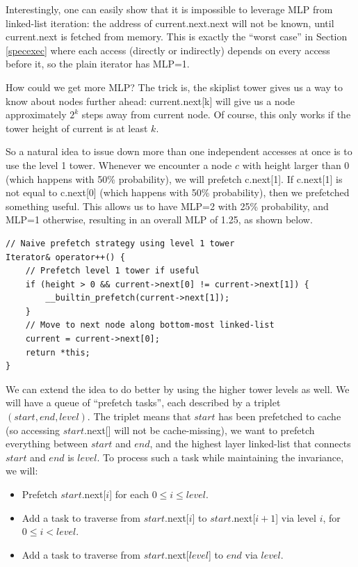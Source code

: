 \documentclass[11pt, usletter]{article}
\begin{document}
Interestingly, one can easily show that it is impossible to leverage MLP 
from linked-list iteration: the address of current.next.next will not be known, 
until current.next is fetched from memory. 
This is exactly the ``worst case'' in Section \ref{specexec} where each access (directly or indirectly) depends on every access before it, 
so the plain iterator has MLP=1.

How could we get more MLP? 
The trick is, the skiplist tower gives us a way to know about nodes further ahead: 
current.next[k] will give us a node approximately $2^k$ steps away from current node.
Of course, this only works if the tower height of current is at least $k$.

So a natural idea to issue down more than one independent accesses at once is to use the level 1 tower. 
Whenever we encounter a node $c$ with height larger than 0 (which happens with 50\% probability), we will prefetch c.next[1]. 
If c.next[1] is not equal to c.next[0] (which happens with 50\% probability), 
then we prefetched something useful. This allows us to have MLP=2 with 25\% probability, and MLP=1 otherwise, 
resulting in an overall MLP of 1.25, as shown below.

\singlespacing\begin{codebox}
\begin{verbatim}
// Naive prefetch strategy using level 1 tower
Iterator& operator++() { 
    // Prefetch level 1 tower if useful
    if (height > 0 && current->next[0] != current->next[1]) {
        __builtin_prefetch(current->next[1]);
    }
    // Move to next node along bottom-most linked-list 
    current = current->next[0]; 
    return *this;
}
\end{verbatim}
\end{codebox}\doublespacing

We can extend the idea to do better by using the higher tower levels as well. 
We will have a queue of ``prefetch tasks'', each described by a triplet $(start,end,level)$. 
The triplet means that $start$ has been prefetched to cache (so accessing $start$.next[] will not be cache-missing), 
we want to prefetch everything between $start$ and $end$,
and the highest layer linked-list that connects $start$ and $end$ is $level$. 
To process such a task while maintaining the invariance, we will: 
\begin{itemize}
[topsep=0pt,partopsep=0pt,itemsep=0pt,parsep=0pt,fullwidth,itemindent=\parindent,listparindent=\parindent]
\item Prefetch $start$.next[$i$] for each $0\leq i\leq level$.
\item Add a task to traverse from $start$.next[$i$] to $start$.next[$i+1$] via level $i$, for $0\leq i<level$.
\item Add a task to traverse from $start$.next[$level$] to $end$ via $level$.
\end{itemize}
\end{document}

